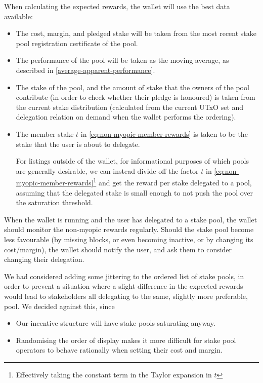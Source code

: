 \documentclass[11pt,a4paper]{article}
\begin{document}
When calculating the expected rewards, the wallet will use the
best data available:
\begin{itemize}
\item The cost, margin, and pledged stake will be taken from the most
  recent stake pool registration certificate of the pool.
\item The performance of the pool will be taken as the moving average, as
  described in \cref{average-apparent-performance}.
\item The stake of the pool, and the amount of stake that the owners
  of the pool contribute (in order to check whether their pledge is
  honoured) is taken from the current stake distribution (calculated
  from the current UTxO set and delegation relation on demand when the
  wallet performs the ordering).
\item The member stake \(t\) in \cref{eq:non-myopic-member-rewards} is taken to
  be the stake that the user is about to delegate.

  For listings outside of the wallet, for informational purposes of which pools
  are generally desirable, we can instead divide off the factor \(t\) in
  \cref{eq:non-myopic-member-rewards}\footnote{Effectively taking the constant
    term in the Taylor expansion in \(t\)} and get the reward per stake
  delegated to a pool, assuming that the delegated stake is small enough to not
  push the pool over the saturation threshold.
\end{itemize}

When the wallet is running and the user has delegated to a stake pool, the
wallet should monitor the non-myopic rewards regularly. Should the stake pool
become less favourable (by missing blocks, or even becoming inactive, or by
changing its cost/margin), the wallet should notify the user, and ask them to
consider changing their delegation.

We had considered adding some jittering to the ordered list of stake pools, in
order to prevent a situation where a slight difference in the expected rewards would
lead to stakeholders all delegating to the same, slightly more preferable, pool.
We decided against this, since
\begin{itemize}
\item Our incentive structure will have stake pools saturating anyway.
\item Randomising the order of display makes it more difficult for stake pool
  operators to behave rationally when setting their cost and margin.
\end{itemize}
\end{document}
